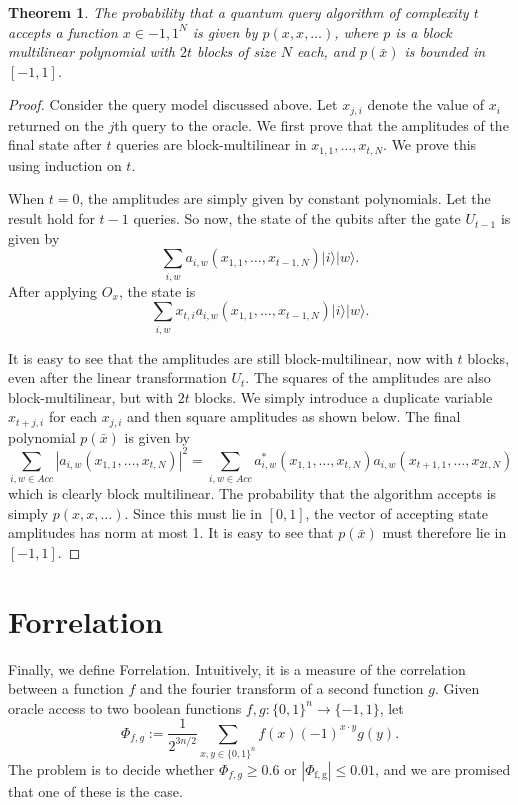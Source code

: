 \documentclass[12pt]{report}
\newtheorem{theorem}{Theorem}
\begin{document}
\begin{theorem}
The probability that a quantum query algorithm of complexity $t$ accepts a function $x \in {-1,1}^N$ is given by $p(x, x, \ldots)$, where $p$ is a block multilinear polynomial with $2t$ blocks of size $N$ each, and $p(\bar{x})$ is bounded in $[-1,1]$.
\end{theorem}
\begin{proof}
Consider the query model discussed above. Let $x_{j,i}$ denote the value of $x_i$ returned on the $j$th query to the oracle. We first prove that the amplitudes of the final state after $t$ queries are block-multilinear in $x_{1,1}, \ldots, x_{t,N}$. We prove this using induction on $t$.

When $t=0$, the amplitudes are simply given by constant polynomials. Let the result hold for $t-1$ queries. So now, the state of the qubits after the gate $U_{t-1}$ is given by
$$\sum_{i,w} a_{i,w}(x_{1,1}, \ldots, x_{t-1,N}) |i\rangle |w\rangle.$$
After applying $O_x$, the state is
$$\sum_{i,w} x_{t,i} a_{i,w}(x_{1,1}, \ldots, x_{t-1,N}) |i\rangle |w\rangle.$$

It is easy to see that the amplitudes are still block-multilinear, now with $t$ blocks, even after the linear transformation $U_t$. The squares of the amplitudes are also block-multilinear, but with $2t$ blocks. We simply introduce a duplicate variable $x_{t+j,i}$ for each $x_{j,i}$ and then square amplitudes as shown below. The final polynomial $p(\bar{x})$ is given by
$$\sum_{i,w \in Acc} |a_{i,w}(x_{1,1}, \ldots, x_{t,N})|^2 = \sum_{i,w \in Acc} a^*_{i,w}(x_{1,1}, \ldots, x_{t,N}) a_{i,w}(x_{t+1,1}, \ldots, x_{2t,N})$$
which is clearly block multilinear. The probability that the algorithm accepts is simply $p(x, x, \ldots)$. Since this must lie in $[0,1]$, the vector of accepting state amplitudes has norm at most 1. It is easy to see that $p(\bar{x})$ must therefore lie in $[-1,1]$.
\end{proof}


\section{Forrelation}
Finally, we define Forrelation. Intuitively, it is a measure of the correlation between a function $f$ and the fourier transform of a second function $g$. Given oracle access to two boolean functions $f,g\colon \{0,1\}^{n} \rightarrow  \{-1,1\}$, let
\begin{equation}
\Phi_{f, g} := \frac{1}{2^{3n/2}} \sum_{x, y \in \{0,1\}^{n}} f(x)(-1)^{x \cdot y} g(y).
\end{equation}
The problem is to decide whether $\Phi_{f,g} \geq 0.6$ or $\left|\Phi_{\mathrm{f}, \mathrm{g}}\right| \leq 0.01$, and we are promised that one of these is the case.
\end{document}
